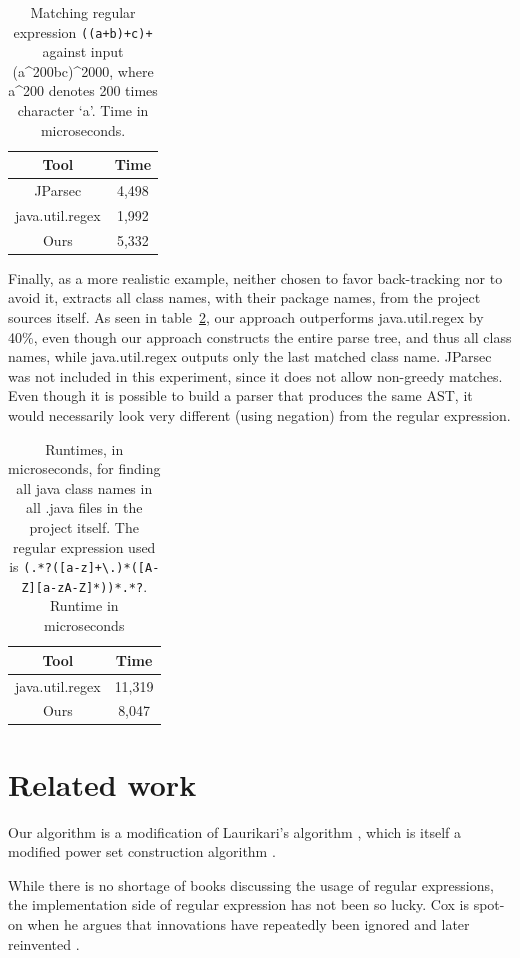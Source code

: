 \documentclass[11pt]{Thesis}
\theoremstyle{definition}
\newcommand{\Tabref}[1]{table~\ref{tab:#1}}
\newcommand{\seclabel}[1]{\label{sec:#1}}
\newcommand{\tablabel}[1]{\label{tab:#1}}
\begin{document}
\begin{table}[htp]\center
\begin{tabular}{cc}
\toprule
Tool & Time\tabularnewline
\midrule
JParsec & 4,498\tabularnewline
java.util.regex & 1,992\tabularnewline
Ours & 5,332\tabularnewline
\bottomrule
\end{tabular}
\caption{Matching regular expression \texttt{((a+b)+c)+} against input
(a\^{}200bc)\^{}2000, where a\^{}200 denotes 200 times character `a'. Time in
microseconds.}
\tablabel{abc}
\end{table}

Finally, as a more realistic example, neither chosen to favor
back-tracking nor to avoid it,  extracts all class names, with their
package names, from the project sources itself.  As seen in
\Tabref{real}, our approach outperforms java.util.regex by 40\%,
even though our approach constructs the entire parse tree, and thus
all class names, while java.util.regex outputs only the last matched
class name. JParsec was not included in this experiment, since it does 
not allow non-greedy matches. Even though it is possible to build
a parser that produces the same AST, it would necessarily look very
different (using negation) from the regular expression.

\begin{table}[htp]\center
\begin{tabular}{cc}
\toprule
Tool & Time\tabularnewline
\midrule
java.util.regex & 11,319\tabularnewline
Ours & 8,047\tabularnewline
\bottomrule
\end{tabular}
\caption{Runtimes, in microseconds, for finding all java class names in all
  .java files in the project itself. The regular expression used is
  \texttt{(.*?([a-z]+\textbackslash.)*([A-Z][a-zA-Z]*))*.*?}.
Runtime in microseconds}
\tablabel{real}
\end{table}


\chapter{Related work}
\seclabel{related}
Our algorithm is a modification of Laurikari's algorithm \cite{Laur00a},
which is itself a modified power set construction algorithm \cite[p. 55]{Sips05a}.

While there is no shortage of books discussing the usage of regular
expressions, the implementation side of regular expression has not
been so lucky. Cox is spot-on when he argues that innovations have
repeatedly been ignored and later reinvented \cite{Cox07a,Cox09a,Cox10a}. 
\end{document}
